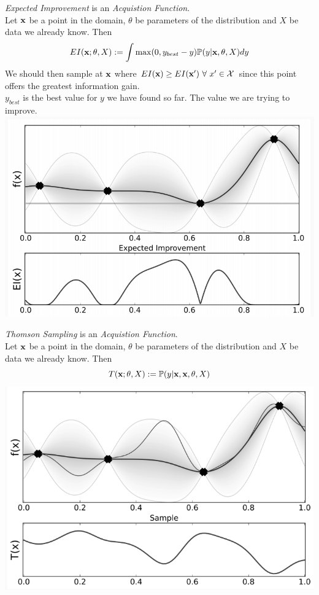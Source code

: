 \documentclass[11pt,a4paper]{article}
\begin{document}
\textit{Expected Improvement} is an \textit{Acquistion Function}.\\
Let $\textbf{x}$ be a point in the domain, $\theta$ be parameters of the distribution and $X$ be data we already know. Then
$$EI(\textbf{x};\theta,X):=\int\max(0,y_{best}-y)\mathbb{P}(y|\textbf{x},\theta,X)dy$$
We should then sample at $\textbf{x}$ where $EI(\x)\geq EI(\x')\ \forall\ x'\in\mathcal{X}$ since this point offers the greatest information gain.\\
\nb $y_{best}$ is the best value for $y$ we have found so far. \ie The value we are trying to improve.\\
\includegraphics[scale=.4]{img/expectedImprovement.png}

\textit{Thomson Sampling} is an \textit{Acquistion Function}.\\
Let $\textbf{x}$ be a point in the domain, $\theta$ be parameters of the distribution and $X$ be data we already know. Then
$$T(\textbf{x};\theta,X):=\mathbb{P}(y|\textbf{x},\textbf{x},\theta,X)$$
\includegraphics[scale=.4]{img/thomsonSampling.png}
\end{document}
